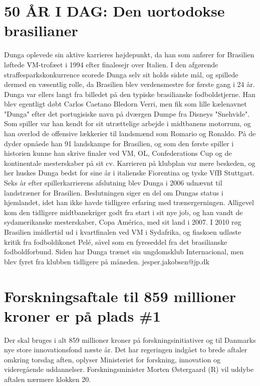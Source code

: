 \section{50 ÅR I DAG: Den uortodokse brasilianer}
\label{JPPOLSameContent2}
Dunga oplevede sin aktive karrieres højdepunkt, da han som anfører for Brasilien løftede VM-trofæet i 1994 efter finalesejr over Italien. I den afgørende straffesparkskonkurrence scorede Dunga selv sit holds sidste mål, og spillede dermed en væsentlig rolle, da Brasilien blev verdensmestre for første gang i 24 år. Dunga var ellers langt fra billedet på den typiske brasilianske fodboldstjerne. Han blev egentligt døbt Carlos Caetano Bledorn Verri, men fik som lille kælenavnet "Dunga" efter det portugisiske navn på dværgen Dumpe fra Disneys "Snehvide". Som spiller var han kendt for sit utrættelige arbejde i midtbanens motorrum, og han overlod de offensive lækkerier til landsmænd som Romario og Ronaldo. På de dyder opnåede han 91 landskampe for Brasilien, og som den første spiller i historien kunne han skrive finaler ved VM, OL, Confederations Cup og de kontinentale mesterskaber på sit cv. Karrieren på klubplan var mere beskeden, og her huskes Dunga bedst for sine år i italienske Fiorentina og tyske VfB Stuttgart. Seks år efter spillerkarrierens afslutning blev Dunga i 2006 udnævnt til landstræner for Brasilien. Beslutningen siger en del om Dungas status i hjemlandet, idet han ikke havde tidligere erfaring med trænergerningen. Alligevel kom den tidligere midtbanekriger godt fra start i sit nye job, og han vandt de sydamerikanske mesterskaber, Copa América, med sit land i 2007. I 2010 røg Brasilien imidlertid ud i kvartfinalen ved VM i Sydafrika, og fiaskoen udløste kritik fra fodboldikonet Pelé, såvel som en fyreseddel fra det brasilianske fodboldforbund. Siden har Dunga trænet sin ungdomsklub Internacional, men blev fyret fra klubben tidligere på måneden. jesper.jakobsen@jp.dk 

\section{Forskningsaftale til 859 millioner kroner er på plads \#1}
\label{JVFLMatch1}
Der skal bruges i alt 859 millioner kroner på forskningsinitiativer og til Danmarks nye store innovationsfond næste år. Det har regeringen indgået to brede aftaler omkring torsdag aften, oplyser Ministeriet for forskning, innovation og videregående uddannelser. Forskningsminister Morten Østergaard (R) vil uddybe aftalen nærmere klokken 20.

